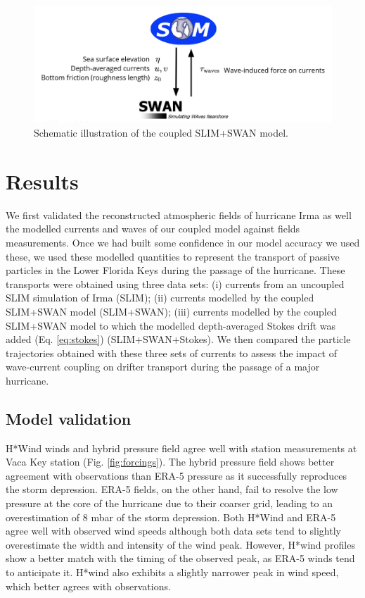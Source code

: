 \documentclass[11pt,a4paper]{article}
\begin{document}
\begin{figure}
    \centering
    \includegraphics[width=.95\textwidth]{fig/coupling.png}
    \caption{Schematic illustration of the coupled SLIM+SWAN model.}
    \label{fig:coupling}
\end{figure}
 

\section{Results}

We first validated the reconstructed atmospheric fields of hurricane Irma as well the modelled currents and waves of our coupled model against fields measurements. Once we had built some confidence in our model accuracy we used these, we used these modelled quantities to represent the transport of passive particles in the Lower Florida Keys during the passage of the hurricane. These transports were obtained using three data sets: (i) currents from an uncoupled SLIM simulation of Irma (SLIM); (ii) currents modelled by the coupled SLIM+SWAN model (SLIM+SWAN); (iii) currents modelled by the coupled SLIM+SWAN model to which the modelled depth-averaged Stokes drift was added (Eq. \ref{eq:stokes}) (SLIM+SWAN+Stokes). We then compared the particle trajectories obtained with these three sets of currents to assess the impact of wave-current coupling on drifter transport during the passage of a major hurricane. 

\subsection{Model validation}

H*Wind winds and hybrid pressure field agree well with station measurements at Vaca Key station (Fig. \ref{fig:forcings}). The hybrid pressure field shows better agreement with observations than ERA-5 pressure as it successfully reproduces the storm depression. ERA-5 fields, on the other hand, fail to resolve the low pressure at the core of the hurricane due to their coarser grid, leading to an overestimation of 8 mbar of the storm depression. Both H*Wind and ERA-5 agree well with observed wind speeds although both data sets tend to slightly overestimate the width and intensity of the wind peak. However, H*wind profiles show a better match with the timing of the observed peak, as ERA-5 winds tend to anticipate it. H*wind also exhibits a slightly narrower peak in wind speed, which better agrees with observations.
\end{document}
